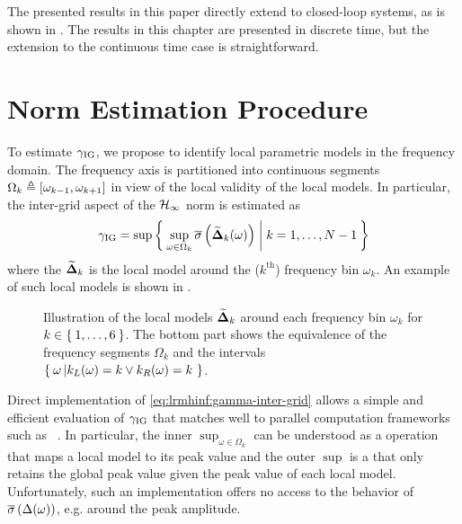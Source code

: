 The presented results in this paper directly extend to closed-loop systems, as is shown in .
The results in this chapter are presented in discrete time, but the extension to the continuous time case is straightforward.

\section{\Hinf{} Norm Estimation Procedure}
\label{sec:lrmhinf:LPMHinf}
To estimate $\gamma_{\mathrm{IG}}$, we propose to identify local parametric models in the frequency domain.
The frequency axis is partitioned into continuous segments $\Omega_k \triangleq \left[  \omega_{k-1} , \omega_{k+1}  \right]$ in view of the local validity of the local models.
In particular, the inter-grid aspect of the $\mathcal{H}_{\infty}$ norm is estimated as
\begin{equation}
  \gamma_{\mathrm{IG}} = 
    \sup \Set{ 
                \sup_{\omega \in \Omega_k} \ensuremath{ \overline{\sigma} \left( \widetilde{\mathbf{\Delta}}_k(\omega) \right) }
                |
                k = 1,\ldots,N-1
                }
   \label{eq:lrmhinf:gamma-inter-grid}
\end{equation}
where the $\widetilde{\mathbf{\Delta}}_{k}$ is the local model around the ($k^{\text{th}}$) frequency bin $\omega_k$.
An example of such local models is shown in .

\begin{figure}
  \centering
  \setlength{\figurewidth}{0.68\columnwidth}
  \setlength{\figureheight}{0.68\figurewidth}
  
  \caption[Illustration of the local models.]{Illustration of the local models $\widetilde{\mathbf{\Delta}}_k$ around each frequency bin $\omega_k$ for $k\in\Set{1,\ldots,6}$.
  The bottom part shows the equivalence of the frequency segments $\Omega_k$ and the intervals $\Set{\omega \left| k_L(\omega) = k \vee k_R(\omega) = k \right.}$.}
\label{fig:lrmhinf:interpol-quantities}
\end{figure}

Direct implementation of \eqref{eq:lrmhinf:gamma-inter-grid} allows a simple and efficient evaluation of $\gamma_{\mathrm{IG}}$ that matches well to parallel computation frameworks such as ~\citep{Dean2008}.
In particular, the inner $\sup_{\omega\in\Omega_k}$ can be understood as a  operation that maps a local model to its peak value and the outer $\sup$ is a  that only retains the global peak value given the peak value of each local model.
Unfortunately, such an implementation offers no access to the behavior of $ \overline{\sigma} \left( \Delta(\omega) \right) $, e.g. around the peak amplitude.

